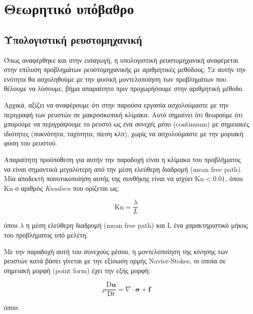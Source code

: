 \chapter{Θεωρητικό υπόβαθρο}
\label{chapter:theory}

\section{Υπολογιστική ρευστομηχανική}

Όπως αναφέρθηκε και στην εισαγωγή, η υπολογιστική ρευστομηχανική αναφέρεται στην επίλυση προβλημάτων ρευστομηχανικής με αριθμητικές μεθόδους.
Σε αυτήν την ενότητα θα ασχοληθούμε με την φυσική μοντελοποίηση των προβλημάτων που θέλουμε να λύσουμε, βήμα απαραίτητο πριν προχωρήσουμε στην αριθμητική μέθοδο.

Αρχικά, αξίζει να αναφέρουμε ότι στην παρούσα εργασία ασχολούμαστε με την περιγραφή των ρευστών σε μακροσκοπική κλίμακα.
Αυτό σημαίνει ότι θεωρούμε ότι μπορούμε να περιγράψουμε το ρευστό ως ένα \emph{συνεχές μέσο} (continuum) με σημειακές ιδιότητες (πυκνότητα, ταχύτητα, πίεση κλπ), χωρίς να ασχολούμαστε με την μοριακή φύση του ρευστού.

Απαραίτητη προϋπόθεση για αυτήν την παραδοχή είναι η κλίμακα του προβλήματος να είναι σημαντικά μεγαλύτερη από την μέση ελεύθερη διαδρομή (mean free path).
Μία αποδεκτή ποσοτικοποίηση αυτής της συνθήκης είναι να ισχύει $\mathrm{Kn} < 0.01$, όπου $\mathrm{Kn}$ ο αριθμός \emph{Knudsen} που ορίζεται ως:

\begin{equation*}
    \mathrm{Kn} = \frac{\lambda}{L}
\end{equation*}

όπου $\lambda$ η μέση ελεύθερη διαδρομή (mean free path) και L ένα χαρακτηριστικό μήκος του προβλήματος υπό μελέτη.

Με την παραδοχή αυτή του συνεχούς μέσου, η μοντελοποίηση της κίνησης των ρευστών κατά βάσει γίνεται με την εξίσωση ορμής Navier-Stokes, οι οποία σε σημειακή μορφή (point form) έχει την εξής μορφή:


\begin{equation}
    \rho \frac{\mathrm{D} \mathbf{u}}{\mathrm{D}t} = \nabla \cdot \mathbf{\sigma} + \mathbf{f}
    \label{eq:cauchy}
\end{equation}

όπου:

